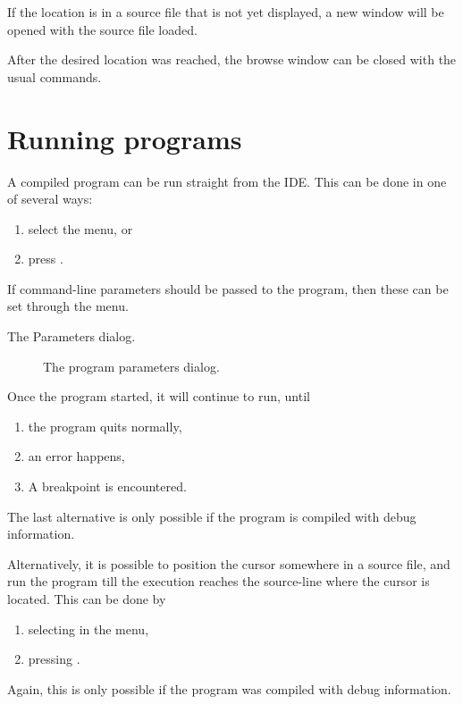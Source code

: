 If the location is in a source file that is not yet displayed, a new 
window will be opened with the source file loaded.

After the desired location was reached, the browse window can be closed 
with the usual commands. 

\section{Running programs}
\label{se:running}
A compiled program can be run straight from the IDE. This can be done
in one of several ways:
\begin{enumerate}
\item select the  menu, or
\item press .
\end{enumerate}
If command-line parameters should be passed to the program, then these
can be set through the  menu. 
\begin{htmlonly}
The Parameters dialog.
\end{htmlonly}
\begin{latexonly}
\begin{figure}[h]
\caption{The program parameters dialog.}\label{fig:params}
\ifpdf
{}
\else
{}
\fi
\end{figure}
\end{latexonly}

Once the program started, it will continue to run, until 
\begin{enumerate}
\item the program quits normally,
\item an error happens,
\item A breakpoint is encountered.
\end{enumerate}
The last alternative is only possible if the program is compiled
with debug information.

Alternatively, it is possible to position the cursor somewhere in a
source file, and run the program till the execution reaches the
source-line where the cursor is located. This can be done by
\begin{enumerate}
\item selecting  in the menu,
\item pressing .
\end{enumerate}
Again, this is only possible if the program was compiled with debug
information.

